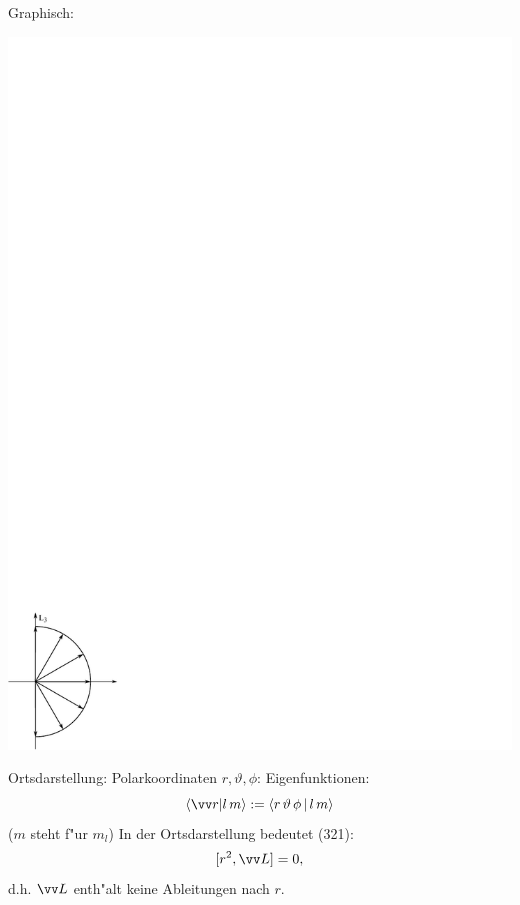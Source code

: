 \documentclass[a4paper]{scrartcl}
\begin{document}
{Graphisch:
\begin{center}
\includegraphics{320L3}
\end{center}
Ortsdarstellung: Polarkoordinaten $r, \vartheta, \phi$:
Eigenfunktionen:
$$ \braket{ \vv r | l \, m } := \Braket{ r \, \vartheta \, \phi | l \, m }$$
($m$ steht f"ur $m_l$)
In der Ortsdarstellung bedeutet (321):
$$[r^2, \vv L ] = 0,$$
d.h. $\vv L$ enth"alt keine Ableitungen nach $r$.

}
\end{document}
